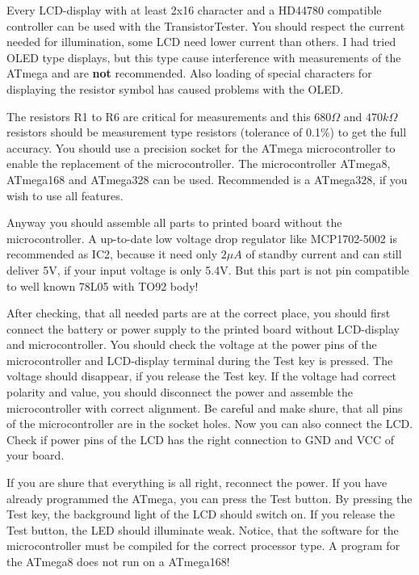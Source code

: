 Every  LCD-display  with  at  least  2x16  character  and   a  HD44780  compatible  controller  can  be  used  with  the
TransistorTester. You should respect the current needed for illumination, some LCD need lower current than others. I had
tried  OLED type  displays,  but  this type  cause  interference with  measurements  of the  ATmega  and  are {\bf  not}
recommended. Also loading of special characters for displaying the resistor symbol has caused problems with the OLED.

The resistors  R1 to  R6 are critical  for measurements and  this \(680\Omega\)  and \(470k\Omega\) resistors  should be
measurement type  resistors (tolerance of 0.1\%)  to get the  full accuracy. You should  use a precision socket  for the
ATmega microcontroller  to enable  the replacement of  the microcontroller. The  microcontroller ATmega8,  ATmega168 and
ATmega328 can be used. Recommended is a ATmega328, if you wish to use all features.

Anyway  you should  assemble all  parts to  printed board  without the  microcontroller. A  up-to-date low  voltage drop
regulator like  MCP1702-5002 is recommended as  IC2, because it  need only \(2\mu A\)  of standby current and  can still
deliver 5V, if your input voltage is only 5.4V. But this part is not pin compatible to well known 78L05 with TO92 body!

After checking, that all needed parts are at the correct  place, you should first connect the battery or power supply to
the printed  board without  LCD-display and  microcontroller. You  should check  the voltage  at the  power pins  of the
microcontroller and LCD-display  terminal during the Test key  is pressed. The voltage should disappear,  if you release
the  Test key.  If the  voltage  had correct  polarity  and value,  you should  disconnect  the power  and assemble  the
microcontroller with  correct alignment. Be  careful and make  shure, that  all pins of  the microcontroller are  in the
socket holes. Now you can also  connect the LCD. Check if power pins of the LCD has the  right connection to GND and VCC
of your board.

If you are shure that everything is all right, reconnect the power. 
If you have already programmed the ATmega, you can press the Test button.
By pressing the Test key, the background light of the LCD should switch on.
If you release the Test button, the LED should illuminate weak.
Notice, that the software for the microcontroller must be compiled for the
correct processor type. A program for the ATmega8 does not run on a ATmega168!

